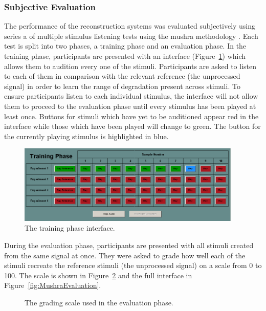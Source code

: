 		\subsubsection*{Subjective Evaluation}
			The performance of the reconstruction systems was evaluated subjectively using series a of multiple
			stimulus listening tests using the \acrshort{mushra} methodology \citep{mushra2014}. Each test is
			split into two phases, a training phase and an evaluation phase. In the training phase,
			participants are presented with an interface (Figure~\ref{fig:MushraTraining}) which allows them to
			audition every one of the stimuli. Participants are asked to listen to each of them in comparison
			with the relevant reference (the unprocessed signal) in order to learn the range of degradation
			present across stimuli. To ensure participants listen to each individual stimulus, the interface
			will not allow them to proceed to the evaluation phase until every stimulus has been played at
			least once.  Buttons for stimuli which have yet to be auditioned appear red in the interface while
			those which have been played will change to green. The button for the currently playing stimulus is
			highlighted in blue.

			\begin{figure}[h!]
				\centering
				\includegraphics[width=0.95\textwidth]{chapter7/Images/MushraTraining.png}
				\caption{The training phase interface.}
				\label{fig:MushraTraining}
			\end{figure}

			During the evaluation phase, participants are presented with all stimuli created from the same
			signal at once. They were asked to grade how well each of the stimuli recreate the reference
			stimuli (the unprocessed signal) on a scale from 0 to 100. The scale is shown in
			Figure~\ref{fig:MushraScale} and the full interface in Figure~\ref{fig:MushraEvaluation}.

			\begin{figure}[h!]
				\centering
				\caption{The grading scale used in the evaluation phase.}
				\label{fig:MushraScale}
			\end{figure}

